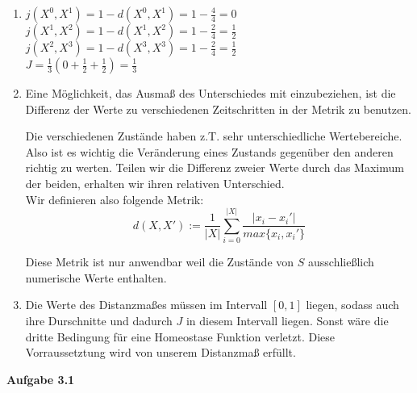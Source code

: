 \documentclass[paper=a4, %
         fontsize=10,  %
         oneside,        %
         headsepline,    %
         notitlepage    %
]{scrartcl}              %
\newcommand{\aufgabe}[1]{\vspace*{0.5cm}\large{\textbf{\textsf{Aufgabe #1}}}\normalsize\vspace*{0.5cm}}
\begin{document}
\begin{enumerate}

\item
$j(X^0, X^1) = 1 - d(X^0, X^1) = 1 - \frac{4}{4} = 0$ \\

$j(X^1, X^2) = 1 - d(X^1, X^2) = 1 - \frac{2}{4} = \frac{1}{2}$ \\

$j(X^2, X^3) = 1 - d(X^3, X^3) = 1 - \frac{2}{4} = \frac{1}{2}$ \\

$J = \frac{1}{3} (0 + \frac{1}{2} + \frac{1}{2}) = \frac{1}{3}$ \\

\item 
Eine Möglichkeit, das Ausmaß des Unterschiedes mit einzubeziehen, ist die Differenz der Werte zu verschiedenen Zeitschritten in der Metrik zu benutzen.
%

Die verschiedenen Zustände haben z.T. sehr unterschiedliche Wertebereiche. Also ist es wichtig die Veränderung eines Zustands gegenüber den anderen richtig zu werten. 
Teilen wir die Differenz zweier Werte durch das Maximum der beiden, erhalten wir ihren relativen Unterschied.\\
Wir definieren also folgende Metrik:
    \[ d(X, X') := \frac{1}{|X|} \sum_{i = 0}^{|X|} \frac{|x_i - x_i'|}{max\{x_i, x_i'\}} \]

Diese Metrik ist nur anwendbar weil die Zustände von $S$ ausschließlich numerische Werte enthalten.

\item 
Die Werte des Distanzmaßes müssen im Intervall $[0, 1]$ liegen, sodass auch ihre Durschnitte und dadurch $J$ in diesem Intervall liegen. Sonst wäre die dritte Bedingung für eine Homeostase Funktion verletzt.
Diese Vorraussetztung wird von unserem Distanzmaß erfüllt.

\end{enumerate} 


\aufgabe{3.1}
\end{document}
